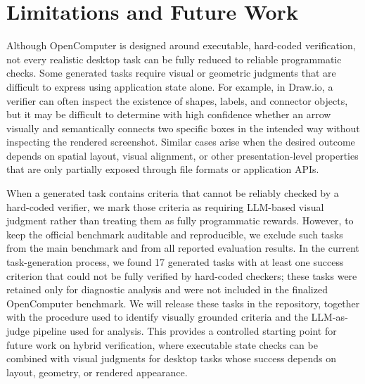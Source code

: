 \section*{Limitations and Future Work}
\label{app:limitations}

Although OpenComputer is designed around executable, hard-coded verification, not every realistic desktop task can be fully reduced to reliable programmatic checks. Some generated tasks require visual or geometric judgments that are difficult to express using application state alone. For example, in Draw.io, a verifier can often inspect the existence of shapes, labels, and connector objects, but it may be difficult to determine with high confidence whether an arrow visually and semantically connects two specific boxes in the intended way without inspecting the rendered screenshot. Similar cases arise when the desired outcome depends on spatial layout, visual alignment, or other presentation-level properties that are only partially exposed through file formats or application APIs.

When a generated task contains criteria that cannot be reliably checked by a hard-coded verifier, we mark those criteria as requiring LLM-based visual judgment rather than treating them as fully programmatic rewards. However, to keep the official benchmark auditable and reproducible, we exclude such tasks from the main benchmark and from all reported evaluation results. In the current task-generation process, we found 17 generated tasks with at least one success criterion that could not be fully verified by hard-coded checkers; these tasks were retained only for diagnostic analysis and were not included in the finalized OpenComputer benchmark. We will release these tasks in the repository, together with the procedure used to identify visually grounded criteria and the LLM-as-judge pipeline used for analysis. This provides a controlled starting point for future work on hybrid verification, where executable state checks can be combined with visual judgments for desktop tasks whose success depends on layout, geometry, or rendered appearance.